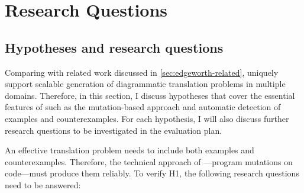 


\section{Research Questions}


%
\subsection{Hypotheses and research questions}

Comparing with related work discussed in \cref{sec:edgeworth-related}, \Edgeworth uniquely support scalable generation of diagrammatic translation problems in multiple domains. Therefore, in this section, I discuss hypotheses that cover the essential features of \Edgeworth such as the mutation-based approach and automatic detection of examples and counterexamples. For each hypothesis, I will also discuss further research questions to be investigated in the evaluation plan. 


An effective translation problem needs to include both examples and counterexamples. Therefore, the technical approach of \Edgeworth---program mutations on \Substance code---must produce them reliably. To verify H1, the following research questions need to be answered:

